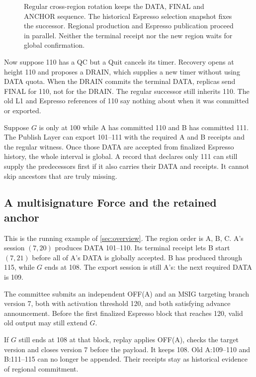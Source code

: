 \documentclass[11pt,a4paper]{article}
\begin{document}
\begin{figure}[htbp]\centering

\caption{Regular cross-region rotation keeps the DATA, FINAL and ANCHOR
sequence. The historical Espresso selection snapshot fixes the successor.
Regional production and Espresso publication proceed in parallel. Neither
the terminal receipt nor the new region waits for global confirmation.}
\label{fig:regular-cross-region}
\end{figure}
\FloatBarrier

Now suppose 110 has a QC but a Quit cancels its timer. Recovery opens at
height 110 and proposes a DRAIN, which supplies a new timer without using
DATA quota. When the DRAIN commits the terminal DATA, replicas send FINAL
for 110, not for the DRAIN. The regular successor still inherits 110. The
old L1 and Espresso references of 110 say nothing about when it was
committed or exported.

Suppose $G$ is only at 100 while A has committed 110 and B has committed
111. The Publish Layer can export 101--111 with the required A and B
receipts and the regular witness. Once those DATA are accepted from
finalized Espresso history, the whole interval is global. A record that
declares only 111 can still supply the predecessors first if it also
carries their DATA and receipts. It cannot skip ancestors that are truly
missing.

\subsection{A multisignature Force and the retained anchor}
\label{sec:force-example}
This is the running example of \cref{sec:overview}. The region order is
A, B, C. A's session $(7,20)$ produces DATA 101--110. Its terminal receipt
lets B start $(7,21)$ before all of A's DATA is globally accepted. B has
produced through 115, while $G$ ends at 108. The export session is still
A's: the next required DATA is 109.

The committee submits an independent OFF(A) and an MSIG targeting branch
version 7, both with activation threshold 120, and both satisfying
advance announcement. Before the first finalized Espresso block that
reaches 120, valid old output may still extend $G$.

If $G$ still ends at 108 at that block, replay applies OFF(A), checks the
target version and closes version 7 before the payload. It keeps 108. Old
A:109--110 and B:111--115 can no longer be appended. Their receipts stay
as historical evidence of regional commitment.
\end{document}
